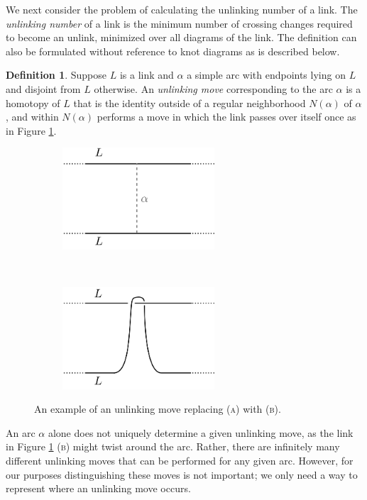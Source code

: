 \documentclass[12pt]{amsart}
\theoremstyle{definition}
\newtheorem{defn}[thm]{Definition}
\theoremstyle{remark}
\begin{document}
We next consider the problem of calculating the unlinking number of a link.
The \emph{unlinking number} of a link is the minimum number of crossing changes required to become an unlink, minimized over all diagrams of the link.
The definition can also be formulated without reference to knot diagrams as is described below.

\begin{defn}
Suppose $L$ is a link and $\alpha$ a simple arc with endpoints lying on $L$ and disjoint from $L$ otherwise.
An \emph{unlinking move} corresponding to the arc $\alpha$ is a homotopy of $L$ that is the identity outside of a regular neighborhood $N(\alpha)$ of $\alpha$, and within $N(\alpha)$ performs a move in which the link passes over itself once as in Figure \ref{fig_unlinkingmove}.\end{defn}

\begin{figure}[ht]
\centering
    \begin{subfigure}[b]{0.5\textwidth}
        \centering
        \includegraphics[height=1.5in]{unlinkingmove_a.png}
        \caption{}
    \end{subfigure}%
~~~~~
    \begin{subfigure}[b]{0.5\textwidth}
        \centering
        \includegraphics[height=1.5in]{unlinkingmove_b.png}
        \caption{}
    \end{subfigure}

\caption{An example of an unlinking move replacing (\textsc{a}) with (\textsc{b}).}
\label{fig_unlinkingmove}
\end{figure}


An arc $\alpha$ alone does not uniquely determine a given unlinking move, as the link in Figure \ref{fig_unlinkingmove} (\textsc{b}) might twist around the arc.
Rather, there are infinitely many different unlinking moves that can be performed for any given arc.
However, for our purposes distinguishing these moves is not important;  we only need a way to represent where an unlinking move occurs.
\end{document}
